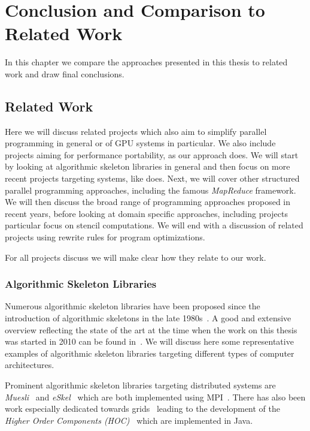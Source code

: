 
\chapter{Conclusion and Comparison to Related Work}

\label{ch:eighth} %

In this chapter we compare the approaches presented in this thesis to related work and draw final conclusions.

\section{Related Work}
Here we will discuss related projects which also aim to simplify parallel programming in general or of GPU systems in particular.
We also include projects aiming for performance portability, as our approach does.
We will start by looking at algorithmic skeleton libraries in general and then focus on more recent projects targeting \GPU systems, like \SkelCL does.
Next, we will cover other structured parallel programming approaches, including the famous \emph{MapReduce} framework.
We will then discuss the broad range of \GPU programming approaches proposed in recent years, before looking at domain specific approaches, including projects particular focus on stencil computations.
We will end with a discussion of related projects using rewrite rules for program optimizations.

For all projects discuss we will make clear how they relate to our work.


\subsection{Algorithmic Skeleton Libraries}
Numerous algorithmic skeleton libraries have been proposed since the introduction of algorithmic skeletons in the late 1980s~\cite{Cole1991}.
A good and extensive overview reflecting the state of the art at the time when the work on this thesis was started in 2010 can be found in~\cite{Gonzalez-VelezL10}.
We will discuss here some representative examples of algorithmic skeleton libraries targeting different types of computer architectures.

Prominent algorithmic skeleton libraries targeting distributed systems are \emph{Muesli}~\cite{Kuchen02} and \emph{eSkel}~\cite{Cole04} which are both implemented using MPI~\cite{MPI}.
There has also been work especially dedicated towards grids~\cite{AltG03a, Alt2007} leading to the development of the \emph{Higher Order Components (HOC)}~\cite{DunnweberG04,DuennweberG09} which are implemented in Java.

